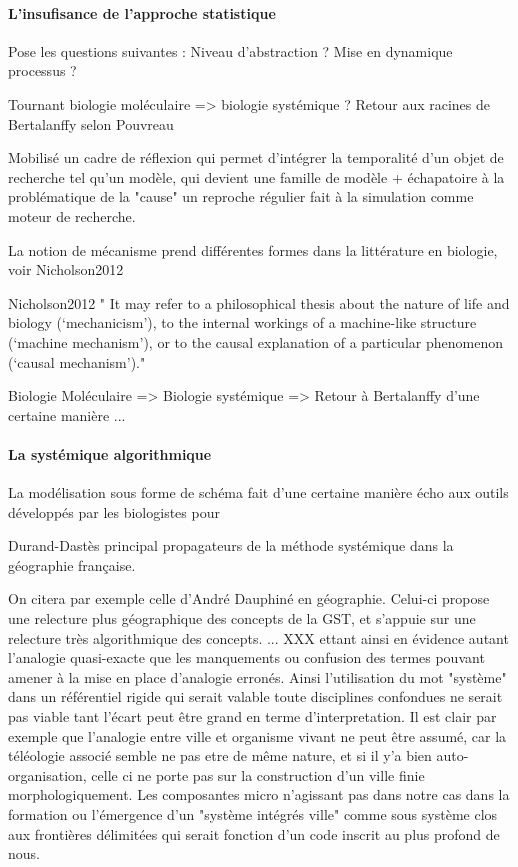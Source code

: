 {\paragraph{L'insufisance de l'approche statistique}

Pose les questions suivantes : 
Niveau d'abstraction ?
Mise en dynamique processus ? 

Tournant biologie moléculaire => biologie systémique ? Retour aux racines de Bertalanffy selon Pouvreau

Mobilisé un cadre de réflexion qui permet d'intégrer la temporalité d'un objet de recherche tel qu'un modèle, qui devient une famille de modèle + échapatoire à la problématique de la "cause" un reproche régulier fait à la simulation comme moteur de recherche.

La notion de mécanisme prend différentes formes dans la littérature en biologie, voir Nicholson2012

Nicholson2012 " It may refer to a philosophical thesis about the nature of life and biology (‘mechanicism’), to the internal workings of a machine-like structure (‘machine mechanism’), or to the causal explanation of a particular phenomenon (‘causal mechanism’)."

Biologie Moléculaire => Biologie systémique => Retour à Bertalanffy d'une certaine manière ...

\paragraph{La systémique algorithmique}

La modélisation sous forme de schéma fait d'une certaine manière écho aux outils développés par les biologistes pour 
 
Durand-Dastès principal propagateurs de la méthode systémique dans la géographie française. \autocite[11]{Orain2001}


On citera par exemple celle d'André Dauphiné en géographie. Celui-ci propose une relecture plus géographique des concepts de la GST, et s'appuie sur une relecture très algorithmique des concepts. ... XXX ettant ainsi en évidence autant l'analogie quasi-exacte que les manquements ou confusion des termes pouvant amener à la mise en place d'analogie erronés. Ainsi l'utilisation du mot "système" dans un référentiel rigide qui serait valable toute disciplines confondues ne serait pas viable tant l'écart peut être grand en terme d'interpretation. Il est clair par exemple que l'analogie entre ville et organisme vivant ne peut être assumé, car la téléologie associé semble ne pas etre de même nature, et si il y'a bien auto-organisation, celle ci ne porte pas sur la construction d'un ville finie morphologiquement. Les composantes micro n'agissant pas dans notre cas dans la formation ou l'émergence d'un "système intégrés ville" comme sous système clos aux frontières délimitées qui serait fonction d'un code inscrit au plus profond de nous. \autocite[]{Pumain1989} 

}
